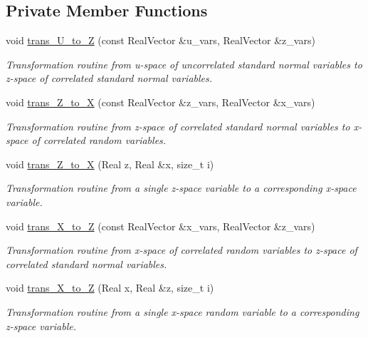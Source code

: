\subsection*{Private Member Functions}
\begin{DoxyCompactItemize}
\item 
void \hyperlink{classPecos_1_1NatafTransformation_add8c6a190d982a11a89c893090f7addc}{trans\+\_\+\+U\+\_\+to\+\_\+Z} (const Real\+Vector \&u\+\_\+vars, Real\+Vector \&z\+\_\+vars)
\begin{DoxyCompactList}\small\item\em Transformation routine from u-\/space of uncorrelated standard normal variables to z-\/space of correlated standard normal variables. \end{DoxyCompactList}\item 
void \hyperlink{classPecos_1_1NatafTransformation_a5feeecf846fc017c5a28eccb4e955dc1}{trans\+\_\+\+Z\+\_\+to\+\_\+X} (const Real\+Vector \&z\+\_\+vars, Real\+Vector \&x\+\_\+vars)
\begin{DoxyCompactList}\small\item\em Transformation routine from z-\/space of correlated standard normal variables to x-\/space of correlated random variables. \end{DoxyCompactList}\item 
void \hyperlink{classPecos_1_1NatafTransformation_a4abf7f380d1a3f3b4a42c982286f745f}{trans\+\_\+\+Z\+\_\+to\+\_\+X} (Real z, Real \&x, size\+\_\+t i)
\begin{DoxyCompactList}\small\item\em Transformation routine from a single z-\/space variable to a corresponding x-\/space variable. \end{DoxyCompactList}\item 
void \hyperlink{classPecos_1_1NatafTransformation_a08fa15c70e2b4933fe20a1956df8be45}{trans\+\_\+\+X\+\_\+to\+\_\+Z} (const Real\+Vector \&x\+\_\+vars, Real\+Vector \&z\+\_\+vars)
\begin{DoxyCompactList}\small\item\em Transformation routine from x-\/space of correlated random variables to z-\/space of correlated standard normal variables. \end{DoxyCompactList}\item 
void \hyperlink{classPecos_1_1NatafTransformation_a44ef66f532bfdff2676d6cc5eb57b668}{trans\+\_\+\+X\+\_\+to\+\_\+Z} (Real x, Real \&z, size\+\_\+t i)
\begin{DoxyCompactList}\small\item\em Transformation routine from a single x-\/space random variable to a corresponding z-\/space variable. \end{DoxyCompactList}\item 

\end{DoxyCompactItemize}
